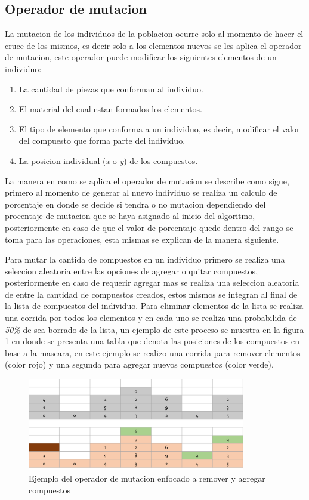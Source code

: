 \subsection{Operador de mutacion}
\label{subsection:mutation_operator}

La mutacion de los individuos de la poblacion ocurre solo al momento de hacer el
cruce de los mismos, es decir solo a los elementos nuevos se les aplica el
operador de mutacion, este operador puede modificar los siguientes elementos de
un individuo:
\begin{enumerate}
  \item La cantidad de piezas que conforman al individuo.
  \item El material del cual estan formados los elementos.
  \item El tipo de elemento que conforma a un individuo, es decir, modificar el
  valor del compuesto que forma parte del individuo.
  \item La posicion individual (\textit{x} o \textit{y}) de los compuestos.
\end{enumerate}

La manera en como se aplica el operador de mutacion se describe como sigue,
primero al momento de generar al nuevo individuo se realiza un calculo de
porcentaje en donde se decide si tendra o no mutacion dependiendo del procentaje
de mutacion que se haya asignado al inicio del algoritmo, posteriormente en caso
de que el valor de porcentaje quede dentro del rango se toma para las
operaciones, esta mismas se explican de la manera siguiente.

Para mutar la cantida de compuestos en un individuo primero se realiza una
seleccion aleatoria entre las opciones de agregar o quitar compuestos,
posteriormente en caso de requerir agregar mas se realiza una seleccion
aleatoria de entre la cantidad de compuestos creados, estos mismos se integran
al final de la lista de compuestos del individuo. Para eliminar elementos de la
lista se realiza una corrida por todos los elementos y en cada uno se realiza
una probabilida de \textit{50\%} de sea borrado de la lista, un ejemplo de este
proceso se muestra en la figura \ref{figure:mutate_add_remove} en donde se
presenta una tabla que denota las posiciones de los compuestos en base a la
mascara, en este ejemplo se realizo una corrida para remover elementos (color
rojo) y una segunda para agregar nuevos compuestos (color verde).

\begin{figure}
  \centering
  \includegraphics[width=0.85\textwidth]{img/mutation_add_remove.png}
  \caption{Ejemplo del operador de mutacion enfocado a remover y agregar compuestos}
  \label{figure:mutate_add_remove}
\end{figure}

